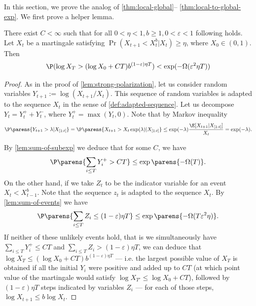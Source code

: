 \documentclass[11pt]{article}
\begin{document}
In this section, we prove the analog of \cref{thm:local-global}-- \cref{thm:local-to-global-exp}. We first prove a helper lemma.
\begin{lemma}
	\label{lem:single-piece-suction}
	There exist $C < \infty$ such that for all $0<\eta<1, b\ge 1, 0<\varepsilon<1$
	following holds. Let $X_t$ be a martingale satisfying $\Pr(X_{t+1} < X_t^{b} | X_{t}) \geq \eta$, where $X_0 \in (0, 1)$. Then
	\begin{equation*}
		\P(\log X_T > (\log X_0 + CT) b^{(1-\varepsilon)\eta T}) < \exp(-\Omega( \varepsilon^2 \eta T))
	\end{equation*}
\end{lemma}
\begin{proof}
	As in the proof of \cref{lem:strong-polarization}, let us consider random variables $Y_{t+1} := \log (X_{t+1}/X_t)$. This sequence of random variables is adapted to the sequence $X_t$ in the sense of \cref{def:adapted-sequence}. Let us decompose $Y_t = Y_t^+ + Y_t^-$, where $Y_t^+ = \max(Y_t,0)$.
	Note that by Markov inequality 
	\begin{equation*}
		\P\parens{Y_{t+1} > \lambda | X_{[1:t]}} = \P\parens{X_{t+1} > X_t \exp(\lambda) | X_{[1:t]}} \leq \exp(-\lambda)\frac{\E[X_{t+1} | X_{[1:t]}]}{X_t} = \exp(-\lambda).
	\end{equation*}
	
	By \cref{lem:sum-of-subexp} we deduce that for some $C$, we have
	\begin{equation*}
		\P\parens{\sum_{i \leq T} Y_i^{+} > C T} \leq \exp\parens{-\Omega(T)}.
	\end{equation*}
	On the other hand, if we take $Z_t$ to be the indicator variable for an event $X_t < X_{t-1}^{b}$. Note that the sequence $z_t$ is adapted to the sequence $X_t$. By \cref{lem:sum-of-events} we have
	\begin{equation*}
		\P\parens{\sum_{i \leq T} Z_i \leq (1-\varepsilon) \eta T} \leq \exp\parens{-\Omega(T\varepsilon^2\eta)}.
	\end{equation*}
	If neither of these unlikely events hold, that is we simultaneously have $\sum_{i \leq T} Y_i^{+} \le CT$ and $\sum_{i \leq T} Z_i > (1-\varepsilon) \eta T$, we can deduce that $\log X_T \leq (\log X_0 + CT) b^{(1 - \varepsilon) \eta T}$ --- i.e. the largest possible value of $X_T$ is obtained if all the initial $Y_i$ were positive and added up to $CT$ (at which point value of the martingale would satisfy $\log X_{T'} \leq \log X_0 + CT$), followed by $(1-\varepsilon) \eta T$ steps indicated by variables $Z_i$ --- for each of those steps, $\log X_{t+1} \leq b \log X_t$.
\end{proof}
\end{document}
